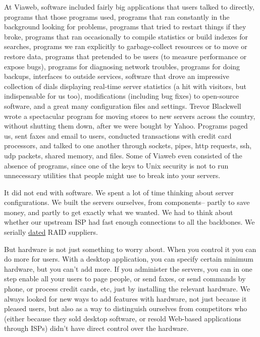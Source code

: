 At Viaweb, software included fairly big applications that users talked
to directly, programs that those programs used, programs that ran
constantly in the background looking for problems, programs that tried
to restart things if they broke, programs that ran occasionally to
compile statistics or build indexes for searches, programs we ran
explicitly to garbage-collect resources or to move or restore data,
programs that pretended to be users (to measure performance or expose
bugs), programs for diagnosing network troubles, programs for doing
backups, interfaces to outside services, software that drove an
impressive collection of dials displaying real-time server statistics (a
hit with visitors, but indispensable for us too), modifications
(including bug fixes) to open-source software, and a great many
configuration files and settings. Trevor Blackwell wrote a spectacular
program for moving stores to new servers across the country, without
shutting them down, after we were bought by Yahoo. Programs paged us,
sent faxes and email to users, conducted transactions with credit card
processors, and talked to one another through sockets, pipes, http
requests, ssh, udp packets, shared memory, and files. Some of Viaweb
even consisted of the absence of programs, since one of the keys to Unix
security is not to run unnecessary utilities that people might use to
break into your servers.

It did not end with software. We spent a lot of time thinking about
server configurations. We built the servers ourselves, from components--
partly to save money, and partly to get exactly what we wanted. We had
to think about whether our upstream ISP had fast enough connections to
all the backbones. We serially
\href{http://groups.google.com/groups?selm=6hdipo\%243o0\%241\%40FreeBSD.csie.NCTU.edu.tw}{dated}
RAID suppliers.

But hardware is not just something to worry about. When you control it
you can do more for users. With a desktop application, you can specify
certain minimum hardware, but you can't add more. If you administer the
servers, you can in one step enable all your users to page people, or
send faxes, or send commands by phone, or process credit cards, etc,
just by installing the relevant hardware. We always looked for new ways
to add features with hardware, not just because it pleased users, but
also as a way to distinguish ourselves from competitors who (either
because they sold desktop software, or resold Web-based applications
through ISPs) didn't have direct control over the hardware.

